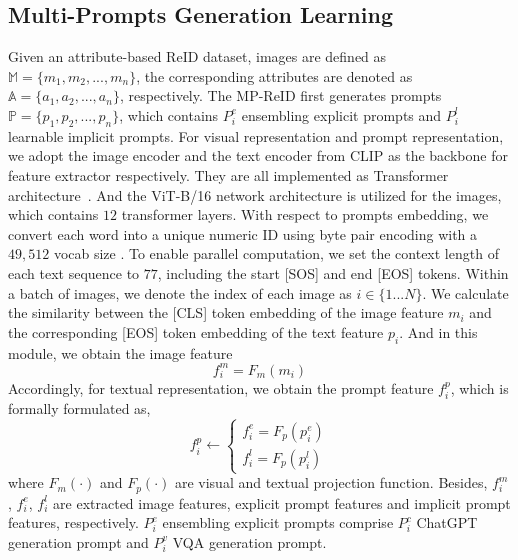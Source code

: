 \documentclass[letterpaper]{article} %
\begin{document}
\subsection{Multi-Prompts Generation Learning}\label{mpgl}
Given an attribute-based ReID dataset, images are defined as $\mathbb{M}=\{m_1, m_2, ..., m_n\}$, the corresponding attributes are denoted as $\mathbb{A}=\{a_1, a_2, ..., a_n\}$, respectively. The MP-ReID first generates prompts $\mathbb{P}=\{p_1, p_2, ..., p_n\}$, which contains $P_{i}^{e}$ ensembling explicit prompts and $P_{i}^{l}$ learnable implicit prompts. For visual representation and prompt representation, we adopt the image encoder and the text encoder from CLIP as the backbone for feature extractor respectively. They are all implemented as Transformer architecture~\cite{he2021dense,zhu2023learning}. And the ViT-B/16 network architecture \cite{dosovitskiy2020vit} is utilized for the images, which contains $12$ transformer layers. With respect to prompts embedding, we convert each word into a unique numeric ID using byte pair encoding with a $49,512$ vocab size \cite{sennrich2016neural}. To enable parallel computation, we set the context length of each text sequence to $77$, including the start [SOS] and end [EOS] tokens. Within a batch of images, we denote the index of each image as $i \in \{ {1...N} \}$. We calculate the similarity between the [CLS] token embedding of the image feature $m_{i}$ and the corresponding [EOS] token embedding of the text feature $p_{i}$. And in this module, we obtain the image feature
\begin{equation}\label{eqn1}
f_{i}^{m} = F_m(m_i)
\end{equation}
Accordingly, for textual representation, we obtain the prompt feature $f_{i}^{p}$, which is formally formulated as,
\begin{equation}\label{eqn2}
{f}_{i}^{p}\leftarrow
\left\{
\begin{array}{l}
{f}_{i}^{e} = F_p(p_{i}^{e})\\
{f}_{i}^{l} = F_p(p_{i}^{l})
\end{array}
\right.
\end{equation}where $F_m (\cdot)$ and $F_p (\cdot)$ are visual and textual projection function. Besides, $f_{i}^{m}$, ${f}_{i}^{e}$, ${f}_{i}^{l}$ are extracted image features, explicit prompt features and implicit prompt features, respectively. $P_{i}^{e}$ ensembling explicit prompts comprise $P_{i}^{c}$ ChatGPT generation prompt and $P_{i}^{v}$ VQA generation prompt.
\end{document}
